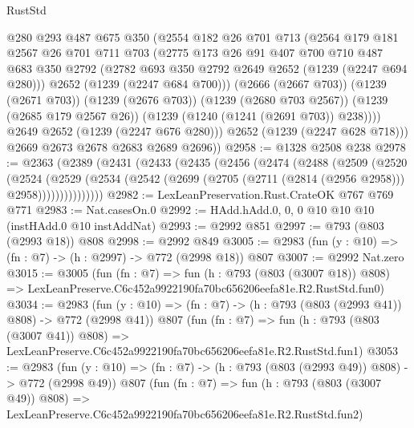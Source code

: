 \begin{lexlean}{RustStd}
\begin{coremodule}
            @280
            @293
            @487
            @675
            @350
            (@2554
              @182
              @26
              @701
              @713
              (@2564
                @179
                @181
                @2567
                @26
                @701
                @711
                @703
                (@2775
                  @173
                  @26
                  @91
                  @407
                  @700
                  @710
                  @487
                  @683
                  @350
                  @2792
                  (@2782 @693 @350 @2792 @2649 @2652 (@1239 (@2247 @694 @280)))
                  @2652
                  (@1239 (@2247 @684 @700)))
                (@2666 (@2667 @703))
                (@1239 (@2671 @703))
                (@1239 (@2676 @703))
                (@1239 (@2680 @703 @2567))
                (@1239 (@2685 @179 @2567 @26))
                (@1239 (@1240 (@1241 (@2691 @703)) @238))))
            @2649
            @2652
            (@1239 (@2247 @676 @280)))
          @2652
          (@1239 (@2247 @628 @718)))
        @2669
        @2673
        @2678
        @2683
        @2689
        @2696))
@2958 := @1328 @2508 @238
@2978 := @2363
    (@2389
      (@2431
        (@2433
          (@2435
            (@2456
              (@2474
                (@2488
                  (@2509
                    (@2520
                      (@2524
                        (@2529
                          (@2534
                            (@2542 (@2699 (@2705 (@2711 (@2814 (@2956 @2958))) @2958)))))))))))))))
@2982 := LexLeanPreservation.Rust.CrateOK @767 @769 @771
@2983 := Nat.casesOn.{0}
@2992 := HAdd.hAdd.{0, 0, 0} @10 @10 @10 (instHAdd.{0} @10 instAddNat)
@2993 := @2992 @851
@2997 := @793 (@803 (@2993 @18)) @808
@2998 := @2992 @849
@3005 := @2983 (fun (y : @10) => (fn : @7) -> (h : @2997) -> @772 (@2998 @18)) @807
@3007 := @2992 Nat.zero
@3015 := @3005
    (fun (fn : @7) =>
    fun (h : @793 (@803 (@3007 @18)) @808) =>
    LexLeanPreserve.C6c452a9922190fa70bc656206eefa81e.R2.RustStd.fun0)
@3034 := @2983
    (fun (y : @10) => (fn : @7) -> (h : @793 (@803 (@2993 @41)) @808) -> @772 (@2998 @41))
    @807
    (fun (fn : @7) =>
    fun (h : @793 (@803 (@3007 @41)) @808) =>
    LexLeanPreserve.C6c452a9922190fa70bc656206eefa81e.R2.RustStd.fun1)
@3053 := @2983
    (fun (y : @10) => (fn : @7) -> (h : @793 (@803 (@2993 @49)) @808) -> @772 (@2998 @49))
    @807
    (fun (fn : @7) =>
    fun (h : @793 (@803 (@3007 @49)) @808) =>
    LexLeanPreserve.C6c452a9922190fa70bc656206eefa81e.R2.RustStd.fun2)

\end{coremodule}
\end{lexlean}
